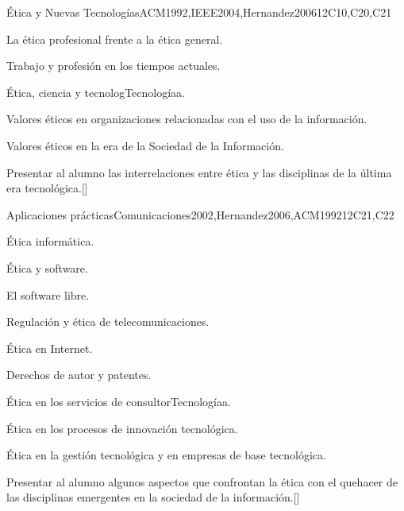 \begin{syllabus}
\begin{unit}{}{Ética y Nuevas Tecnologías}{ACM1992,IEEE2004,Hernandez2006}{12}{C10,C20,C21}
\begin{topics}
	\item La ética profesional frente a la ética general.
	\item Trabajo y profesión en los tiempos actuales.
	\item Ética, ciencia y tecnologTecnologíaa.
	\item Valores éticos en organizaciones relacionadas con el uso de la información.
	\item Valores éticos en la era de la Sociedad de la Información.
\end{topics}
\begin{learningoutcomes}
	\item Presentar al alumno las interrelaciones entre ética y las disciplinas de la última era tecnológica.[\Familiarity]
\end{learningoutcomes}
\end{unit}

\begin{unit}{}{Aplicaciones prácticas}{Comunicaciones2002,Hernandez2006,ACM1992}{12}{C21,C22}
\begin{topics}
    \item Ética informática.
	\begin{subtopics}
	    \item Ética y software.
	    \item El software libre.
	\end{subtopics}
    \item Regulación y ética de telecomunicaciones.
	\begin{subtopics}
	    \item Ética en Internet.
	\end{subtopics}
    \item Derechos de autor y patentes.
    \item Ética en los servicios de consultorTecnologíaa.
    \item Ética en los procesos de innovación tecnológica.
    \item Ética en la gestión tecnológica y en empresas de base tecnológica.
\end{topics}
\begin{learningoutcomes}
	\item Presentar al alumno algunos aspectos que confrontan la ética con el quehacer de las disciplinas emergentes en la sociedad de la información.[\Familiarity]
\end{learningoutcomes}
\end{unit}



\begin{coursebibliography}
\end{coursebibliography}

\end{syllabus}
